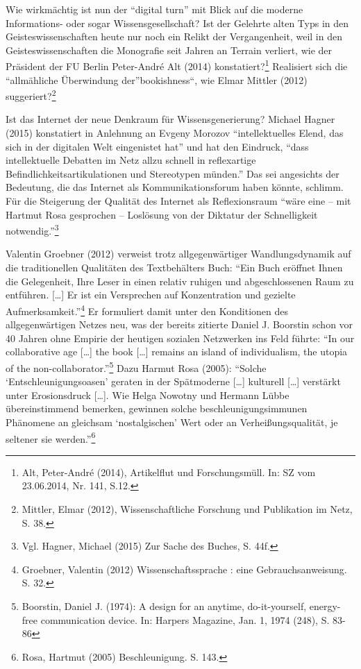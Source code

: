 \documentclass[a4paper,
fontsize=11pt,
oneside,
numbers=noperiodatend,
parskip=half-,
bibliography=totoc,
final
]{scrartcl}
\begin{document}
Wie wirkmächtig ist nun der \enquote{digital turn} mit Blick auf die
moderne Informations- oder sogar Wissensgesellschaft? Ist der Gelehrte
alten Typs in den Geisteswissenschaften heute nur noch ein Relikt der
Vergangenheit, weil in den Geisteswissenschaften die Monografie seit
Jahren an Terrain verliert, wie der Präsident der FU Berlin Peter-André
Alt (2014) konstatiert?\footnote{Alt, Peter-André (2014), Artikelflut
  und Forschungsmüll. In: SZ vom 23.06.2014, Nr. 141, S.12.} Realisiert
sich die \enquote{allmähliche Überwindung der}bookishness``, wie Elmar
Mittler (2012) suggeriert?\footnote{Mittler, Elmar (2012),
  Wissenschaftliche Forschung und Publikation im Netz, S. 38.}

Ist das Internet der neue Denkraum für Wissensgenerierung? Michael
Hagner (2015) konstatiert in Anlehnung an Evgeny Morozov
\enquote{intellektuelles Elend, das sich in der digitalen Welt
eingenistet hat} und hat den Eindruck, \enquote{dass intellektuelle
Debatten im Netz allzu schnell in reflexartige
Befindlichkeitsartikulationen und Stereotypen münden.} Das sei
angesichts der Bedeutung, die das Internet als Kommunikationsforum haben
könnte, schlimm. Für die Steigerung der Qualität des Internet als
Reflexionsraum \enquote{wäre eine -- mit Hartmut Rosa gesprochen --
Loslösung von der Diktatur der Schnelligkeit notwendig.}\footnote{Vgl.
  Hagner, Michael (2015) Zur Sache des Buches, S. 44f.}

Valentin Groebner (2012) verweist trotz allgegenwärtiger
Wandlungsdynamik auf die traditionellen Qualitäten des Textbehälters
Buch: \enquote{Ein Buch eröffnet Ihnen die Gelegenheit, Ihre Leser in
einen relativ ruhigen und abgeschlossenen Raum zu entführen.
{[}\ldots{}{]} Er ist ein Versprechen auf Konzentration und gezielte
Aufmerksamkeit.}\footnote{Groebner, Valentin (2012) Wissenschaftssprache
  : eine Gebrauchsanweisung. S. 32.} Er formuliert damit unter den
Konditionen des allgegenwärtigen Netzes neu, was der bereits zitierte
Daniel J. Boorstin schon vor 40 Jahren ohne Empirie der heutigen
sozialen Netzwerken ins Feld führte: \enquote{In our collaborative age
{[}\ldots{}{]} the book {[}\ldots{}{]} remains an island of
individualism, the utopia of the non-collaborator.}\footnote{Boorstin,
  Daniel J. (1974): A design for an anytime, do-it-yourself, energy-free
  communication device. In: Harpers Magazine, Jan. 1, 1974 (248), S.
  83-86} Dazu Harmut Rosa (2005): \enquote{Solche
\enquote{Entschleunigungsoasen} geraten in der Spätmoderne
{[}\ldots{}{]} kulturell {[}\ldots{}{]} verstärkt unter Erosionsdruck
{[}\ldots{}{]}. Wie Helga Nowotny und Hermann Lübbe übereinstimmend
bemerken, gewinnen solche beschleunigungsimmunen Phänomene an gleichsam
\enquote{nostalgischen} Wert oder an Verheißungsqualität, je seltener
sie werden.}\footnote{Rosa, Hartmut (2005) Beschleunigung. S. 143.}
\end{document}
